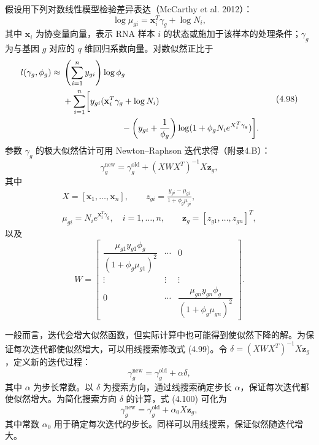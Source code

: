 假设用下列对数线性模型检验差异表达（McCarthy et al. 2012）：
\begin{equation}
\log\mu_{gi}=\mathbf x_i^T\gamma_g+\log N_i,
\tag{4.97}
\end{equation}
其中 $\mathbf x_i$ 为协变量向量，表示 RNA 样本 $i$ 的状态或施加于该样本的处理条件；$\gamma_g$ 为与基因 $g$ 对应的 $q$ 维回归系数向量。对数似然正比于
\begin{equation}
\begin{aligned}
l(\gamma_g,\phi_g)\approx{}&\left(\sum_{i=1}^{n}y_{gi}\right)\log\phi_g\\
&+\sum_{i=1}^{n}\biggl[y_{gi}(\mathbf x_i^T\gamma_g+\log N_i)\\
&\hspace{24mm}-\left(y_{gi}+\frac1{\phi_g}\right)
\log(1+\phi_gN_i e^{X_i^T\gamma_g})\biggr].
\end{aligned}
\tag{4.98}
\end{equation}
参数 $\gamma_g$ 的极大似然估计可用 Newton–Raphson 迭代求得（附录4.B）：
\begin{equation}
\gamma_g^{\mathrm{new}}=\gamma_g^{\mathrm{old}}+(XWX^T)^{-1}X\mathbf z_g,
\tag{4.99}
\end{equation}
其中
\[
\begin{gathered}
X=[\mathbf x_1,\ldots,\mathbf x_n],\qquad
z_{gi}=\frac{y_{gi}-\mu_{gi}}{1+\phi_g\mu_{gi}},\\
\mu_{gi}=N_i e^{\mathbf x_i^T\gamma_g},\quad i=1,\ldots,n,\qquad
\mathbf z_g=[z_{g1},\ldots,z_{gn}]^T,
\end{gathered}
\]
以及
\[
W=\begin{bmatrix}
\dfrac{\mu_{g1}y_{g1}\phi_g}{(1+\phi_g\mu_{g1})^2}&\cdots&0\\
\vdots&\vdots&\vdots\\
0&\cdots&\dfrac{\mu_{gn}y_{gn}\phi_g}{(1+\phi_g\mu_{gn})^2}
\end{bmatrix}.
\]

一般而言，迭代会增大似然函数，但实际计算中也可能得到使似然下降的解。为保证每次迭代都使似然增大，可以用线搜索修改式 (4.99)。令 $\delta=(XWX^T)^{-1}X\mathbf z_g$，定义新的迭代过程：
\begin{equation}
\gamma_g^{\mathrm{new}}=\gamma_g^{\mathrm{old}}+\alpha\delta,
\tag{4.100}
\end{equation}
其中 $\alpha$ 为步长常数。以 $\delta$ 为搜索方向，通过线搜索确定步长 $\alpha$，保证每次迭代都使似然增大。为简化搜索方向 $\delta$ 的计算，式 (4.100) 可化为
\begin{equation}
\gamma_g^{\mathrm{new}}=\gamma_g^{\mathrm{old}}+\alpha_0X\mathbf z_g,
\tag{4.101}
\end{equation}
其中常数 $\alpha_0$ 用于确定每次迭代的步长。同样可以用线搜索，保证似然随迭代增大。

